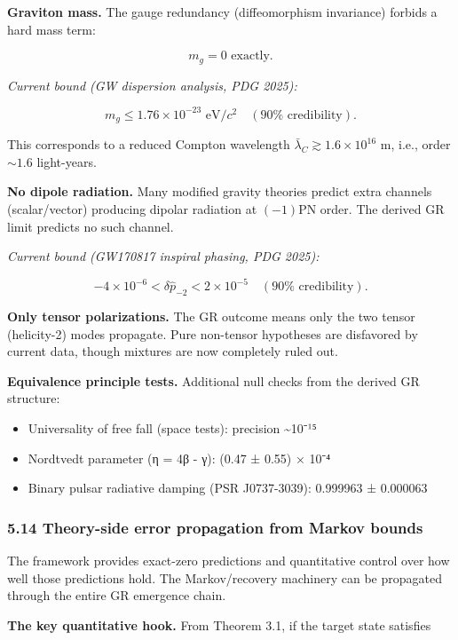 \textbf{Graviton mass.} The gauge redundancy (diffeomorphism invariance) forbids a hard mass term:

\[
m_g = 0 \text{ exactly.}
\]

\emph{Current bound (GW dispersion analysis, PDG 2025):}

\[
m_g \le 1.76 \times 10^{-23} \text{ eV}/c^2 \quad (90\% \text{ credibility}).
\]

This corresponds to a reduced Compton wavelength \(\bar{\lambda}_C \gtrsim 1.6 \times 10^{16}\) m, i.e., order \(\sim 1.6\) light-years.

\textbf{No dipole radiation.} Many modified gravity theories predict extra channels (scalar/vector) producing dipolar radiation at \((-1)\)PN order. The derived GR limit predicts no such channel.

\emph{Current bound (GW170817 inspiral phasing, PDG 2025):}

\[
-4 \times 10^{-6} < \delta\hat{p}_{-2} < 2 \times 10^{-5}
\quad (90\% \text{ credibility}).
\]

\textbf{Only tensor polarizations.} The GR outcome means only the two tensor (helicity-2) modes propagate. Pure non-tensor hypotheses are disfavored by current data, though mixtures are now completely ruled out.

\textbf{Equivalence principle tests.} Additional null checks from the derived GR structure:

\begin{itemize}
\tightlist
\item
  Universality of free fall (space tests): precision \textasciitilde10⁻¹⁵
\item
  Nordtvedt parameter (η = 4β - γ): (0.47 ± 0.55) × 10⁻⁴
\item
  Binary pulsar radiative damping (PSR J0737-3039): 0.999963 ± 0.000063
\end{itemize}

\subsubsection{5.14 Theory-side error propagation from Markov bounds}\label{514-theory-side-error-propagation-from-markov-bounds}

The framework provides exact-zero predictions and quantitative control over how well those predictions hold. The Markov/recovery machinery can be propagated through the entire GR emergence chain.

\textbf{The key quantitative hook.} From Theorem 3.1, if the target state satisfies

